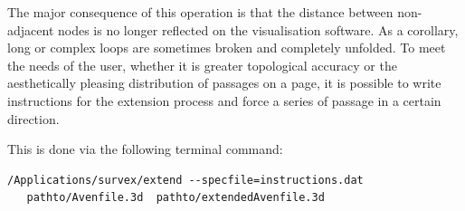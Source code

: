 \begin{marginfigure}
 \checkoddpage \ifoddpage \forcerectofloat \else \forceversofloat \fi
 \centering
\end{marginfigure}

The major consequence of this operation is that the distance between non-adjacent nodes is no longer reflected on the visualisation software. As a corollary, long or complex loops are sometimes broken and completely unfolded. To meet the needs of the user, whether it is greater topological accuracy or the aesthetically pleasing distribution of passages on a page, it is possible to write instructions for the extension process and force a series of passage in a certain direction.

 

This is done via the following terminal command:
\begin{verbatim}
/Applications/survex/extend --specfile=instructions.dat 
   pathto/Avenfile.3d  pathto/extendedAvenfile.3d
\end{verbatim}

